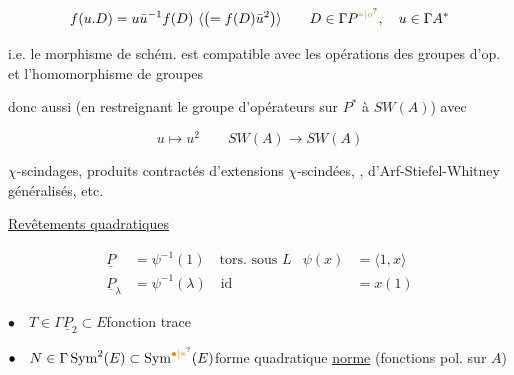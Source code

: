 \[
f(u.D)=u\bar u^{-1}f(D)\ \inserted{\left(=f(D)\bar u^2\right)}
\qquad D\in\Gamma P^{\unsure{*|o}},\quad u\in\Gamma A^*
\]

i.e. le morphisme de schém. est compatible avec les opérations des groupes d'op.  et l'homomorphisme de groupes


donc aussi (en restreignant le groupe d'opérateurs sur $P^*$ à $SW(A)$) avec

\[
u\longmapsto u^2\qquad SW(A)\longrightarrow SW(A)
\]



$\chi$-scindages, produits contractés d'extensions $\chi$-scindées,   ,  d'Arf-Stiefel-Whitney généralisés, etc.



\uline{Revêtements quadratiques}


\[
\begin{aligned}
\underline P&=\psi^{-1}(1)\quad\text{tors. sous }L &\psi(x)&=\langle1,x\rangle\\
\underline P_\lambda&=\psi^{-1}(\lambda)\quad\text{id}&&=x(1)
\end{aligned}
\]

$\bullet\quad T\in\Gamma\underline P_2\subset E$\qquad fonction trace

$\bullet\quad N\in\Gamma\operatorname{Sym}^2(E)\subset\operatorname{Sym}^{\unsure{\bullet|*}}(E)$\qquad forme quadratique \uline{norme} (fonctions pol. sur $A$)

